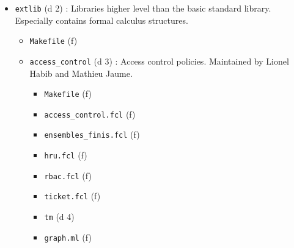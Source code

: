 \begin{itemize}
\begin{itemize}
\begin{itemize}
    \item {\tt focdoc.dtd} (f) :
    \item {\tt focdoc.rnc} (f) :
    \item {\tt focdoc.xsd} (f) :
    \item {\tt focdoc2html.xsl} : Transforms some \focalizedoc-XML into
        HTML + MathML.
    \item {\tt focdoc2tex.xsl} (f) : Transforms some \focalizedoc-XML
        into \latex.
    \item {\tt main\_docgen.ml} (f) : Engine extracting information from
        a \focalize\ source code to produce \focalizedoc-XML.
    \item {\tt main\_docgen.mli} (f)
    \item {\tt mmlctop2\_0.xsl} (f) : Transforms HTML + MathML into
      HTML.
    \item {\tt proposition.xsl} (f) : : Processing of logical
      expressions from \focalizedoc-XML to HTML + MathML.
    \item {\tt proposition2tex.xsl} (f) : Processing of logical
      expressions from \focalizedoc-XML to \latex.
    \item {\tt utils\_docgen.ml} (f) : Various helpers used for XML
      production.
    \item {\tt utils\_docgen.mli} (f)
    \end{itemize}
  \item {\tt extlib} (d 2) : Libraries higher level than the basic
    standard library. Especially contains formal calculus structures.
    \begin{itemize}
    \item {\tt Makefile} (f)
    \item {\tt access\_control} (d 3) : Access control
      policies. Maintained by Lionel Habib and Mathieu Jaume.
      \begin{itemize}
      \item {\tt Makefile} (f)
      \item {\tt access\_control.fcl} (f)
      \item {\tt ensembles\_finis.fcl} (f)
      \item {\tt hru.fcl} (f)
      \item {\tt rbac.fcl} (f)
      \item {\tt ticket.fcl} (f)
      \item {\tt tm} (d 4)
        \item \hspace{0.7cm} {\tt graph.ml} (f)

\end{itemize}
\end{itemize}
\end{itemize}
\end{itemize}
